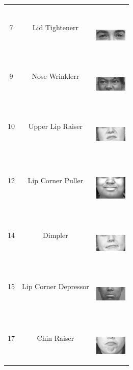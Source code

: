 \documentclass[10pt, conference, compsocconf]{IEEEtran}
\begin{document}
\begin{table}
\begin{tabular}{ccl}
		7 & Lid Tightenerr & \ \ \ \begin{minipage} {0.1\textwidth}   
			\includegraphics[width=0.6in]{AUimage/AU7.png}  
		\end{minipage}\\
		9 & Nose Wrinklerr & \ \ \ \begin{minipage} {0.1\textwidth}   
			\includegraphics[width=0.6in]{AUimage/AU9.png}  
		\end{minipage}\\
		10 & Upper Lip Raiser & \ \ \ \begin{minipage} {0.1\textwidth}   
			\includegraphics[width=0.6in]{AUimage/AU10.png}  
		\end{minipage}\\
		12 & Lip Corner Puller & \ \ \ \begin{minipage} {0.1\textwidth}   
			\includegraphics[width=0.6in]{AUimage/AU12.png}  
		\end{minipage}\\
		14 & Dimpler & \ \ \ \begin{minipage} {0.1\textwidth}   
			\includegraphics[width=0.6in]{AUimage/AU14.png}  
		\end{minipage}\\
		15 & Lip Corner Depressor & \ \ \ \begin{minipage} {0.1\textwidth}   
			\includegraphics[width=0.6in]{AUimage/AU15.png}  
		\end{minipage}\\
		17 & Chin Raiser & \ \ \ \begin{minipage} {0.1\textwidth}   
			\includegraphics[width=0.6in]{AUimage/AU17.png}  

\end{minipage}
\end{tabular}
\end{table}
\end{document}
